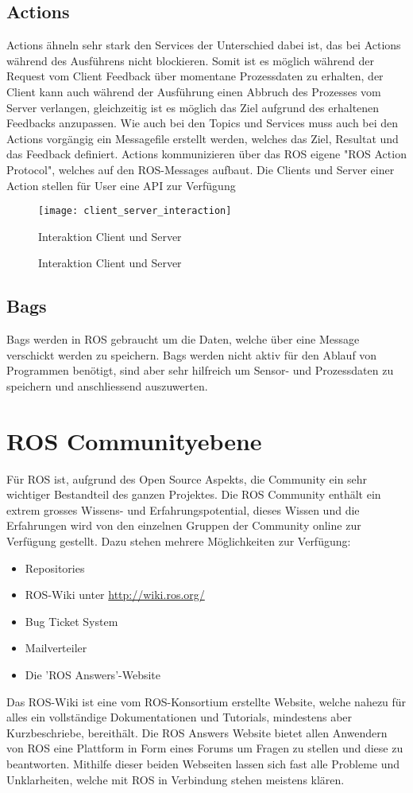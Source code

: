 \subsection{Actions}
Actions ähneln sehr stark den Services der Unterschied dabei ist, das bei Actions während des Ausführens nicht blockieren. Somit ist es möglich während der Request vom Client Feedback über momentane Prozessdaten zu erhalten, der Client kann auch während der Ausführung einen Abbruch des Prozesses vom Server verlangen, gleichzeitig ist es möglich das Ziel aufgrund des erhaltenen Feedbacks anzupassen. Wie auch bei den Topics und Services muss auch bei den Actions vorgängig ein Messagefile erstellt werden, welches das Ziel, Resultat und das Feedback definiert. Actions kommunizieren über das ROS eigene "ROS Action Protocol", welches auf den ROS-Messages aufbaut. Die Clients und Server einer Action stellen für User eine API zur Verfügung
\begin{figure}[H]
	\centering
	\texttt{[image: client\_server\_interaction]}
	\caption{Interaktion Client und Server}{Interaktion Client und Server\cite{actionli12:online}}
	\label{fig:clientServerInteraction}
\end{figure}

\subsection{Bags}
Bags werden in ROS gebraucht um die Daten, welche über eine Message verschickt werden zu speichern. Bags werden nicht aktiv für den Ablauf von Programmen benötigt, sind aber sehr hilfreich um Sensor- und Prozessdaten zu speichern und anschliessend auszuwerten.

\section{ROS Communityebene}
Für ROS ist, aufgrund des Open Source Aspekts, die Community ein sehr wichtiger Bestandteil des ganzen Projektes. Die ROS Community enthält ein extrem grosses Wissens- und Erfahrungspotential, dieses Wissen und die Erfahrungen wird von den einzelnen Gruppen der Community online zur Verfügung gestellt. Dazu stehen mehrere Möglichkeiten zur Verfügung:
\begin{itemize}
	\item Repositories
	\item ROS-Wiki unter \url{http://wiki.ros.org/}
	\item Bug Ticket System
	\item Mailverteiler
	\item Die 'ROS Answers'-Website	
\end{itemize} 
Das ROS-Wiki ist eine vom ROS-Konsortium erstellte Website, welche nahezu für alles ein vollständige Dokumentationen und Tutorials, mindestens aber Kurzbeschriebe, bereithält. Die ROS Answers Website bietet allen Anwendern von ROS eine Plattform in Form eines Forums um Fragen zu stellen und diese zu beantworten. Mithilfe dieser beiden Webseiten lassen sich fast alle Probleme und Unklarheiten, welche mit ROS in Verbindung stehen meistens klären.


